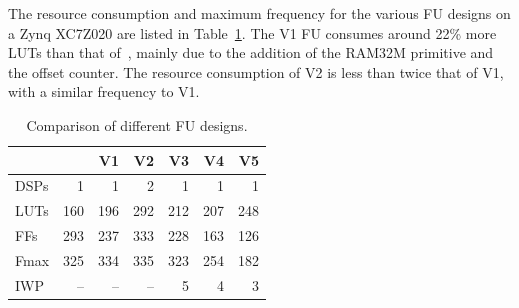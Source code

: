 The resource consumption and maximum frequency for the various FU designs on a Zynq XC7Z020 are listed in Table~\ref{FU_table}.
The V1 FU consumes around 22\% more LUTs than that of~\cite{li2016area}, mainly due to the addition of the RAM32M primitive and the offset counter. 
The resource consumption of V2 is less than twice that of V1, with a similar frequency to V1.



\begin{table}[tb]
	\caption{Comparison of different FU designs.}
	\label{FU_table}
	\centering
	\small
	\begin{tabular}{lrrrrrr}
		\toprule
		     & ~\cite{li2016area} & V1  & V2  & V3  & V4  & V5  \\ \midrule
		DSPs &         1          &  1  &  2  &  1  &  1  &  1  \\
		LUTs &        160         & 196 & 292 & 212 & 207 & 248 \\
		FFs  &        293         & 237 & 333 & 228 & 163 & 126 \\
		Fmax &        325         & 334 & 335 & 323 & 254 & 182 \\
		IWP  &         --         & --  & --  &  5  &  4  &  3  \\ \bottomrule
	\end{tabular}
\end{table}



